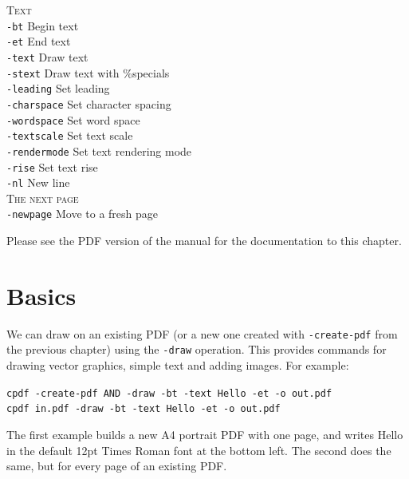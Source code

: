 \documentclass{book}
\begin{document}
{\begin{framed}
   \vspace{1.5mm}
   \noindent \textsc{Text}\\
   \noindent\verb!-bt! Begin text\\
   \noindent\verb!-et! End text\\
   \noindent\verb!-text! Draw text\\
   \noindent\verb!-stext! Draw text with \%specials\\
   \noindent\verb!-leading! Set leading\\
   \noindent\verb!-charspace! Set character spacing\\
   \noindent\verb!-wordspace! Set word space\\
   \noindent\verb!-textscale! Set text scale\\
   \noindent\verb!-rendermode! Set text rendering mode\\
   \noindent\verb!-rise! Set text rise\\
   \noindent\verb!-nl! New line\\

   \vspace{1.5mm}
   \noindent \textsc{The next page}\\
   \noindent\verb!-newpage! Move to a fresh page



  \end{framed}}

\vfill
\ifdefined\HCode
  Please see the PDF version of the manual for the documentation to this chapter.
\else


\section{Basics}

We can draw on an existing PDF (or a new one created with \texttt{-create-pdf} from the previous chapter) using the \texttt{-draw} operation. This provides commands for drawing vector graphics, simple text and adding images. For example:

\begin{framed}
 \noindent\small\verb?cpdf -create-pdf AND -draw -bt -text Hello -et -o out.pdf?\\
 \noindent\small\verb?cpdf in.pdf -draw -bt -text Hello -et -o out.pdf?
\end{framed}

\noindent The first example builds a new A4 portrait PDF with one page, and writes Hello in the default 12pt Times Roman font at the bottom left. The second does the same, but for every page of an existing PDF.
\end{document}
